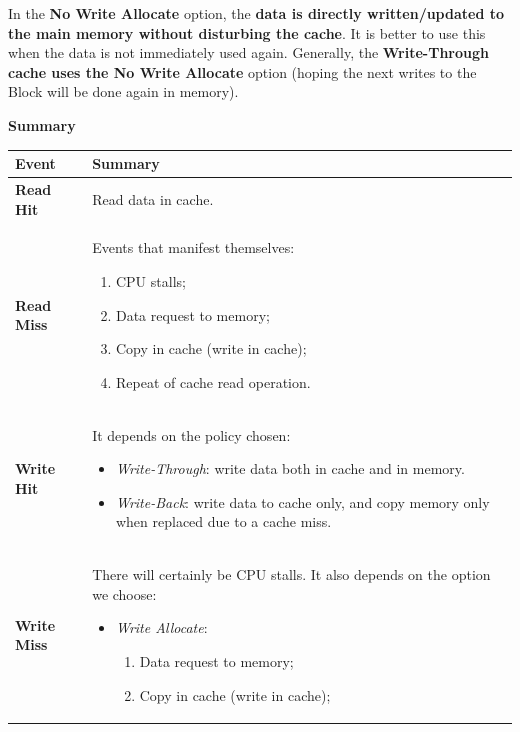 \highspace
In the \textbf{No Write Allocate} option, the \textbf{data is directly written/updated to the main memory without disturbing the cache}. It is better to use this when the data is not immediately used again. Generally, the \textbf{Write-Through cache uses the No Write Allocate} option (hoping the next writes to the Block will be done again in memory).

\newpage

\begin{flushleft}
    \textcolor{Green3}{ \textbf{Summary}}
\end{flushleft}

\begin{table}[!htp]
    \centering
    \begin{tabular}{@{} l p{20em} @{}}
        \toprule
        \textbf{Event} & \textbf{Summary} \\
        \midrule
        \textbf{Read Hit}   & Read data in cache. \\ [.5em]
        \textbf{Read Miss}  & Events that manifest themselves:
        \begin{enumerate}
            \item CPU stalls;
            \item Data request to memory;
            \item Copy in cache (write in cache);
            \item Repeat of cache read operation.
        \end{enumerate} \\
        \cmidrule{1-2}
        \textbf{Write Hit}  & It depends on the policy chosen:
        \begin{itemize}
            \item \emph{Write-Through}: write data both in cache and in memory.
            \item \emph{Write-Back}: write data to cache only, and copy memory only when replaced due to a cache miss.
        \end{itemize} \\ [.5em]
        \textbf{Write Miss} & There will certainly be CPU stalls. It also depends on the option we choose:
        \begin{itemize}
            \item \emph{Write Allocate}:
            \begin{enumerate}
                \item Data request to memory;
                \item Copy in cache (write in cache);

\end{enumerate}
\end{itemize}
\end{tabular}
\end{table}
